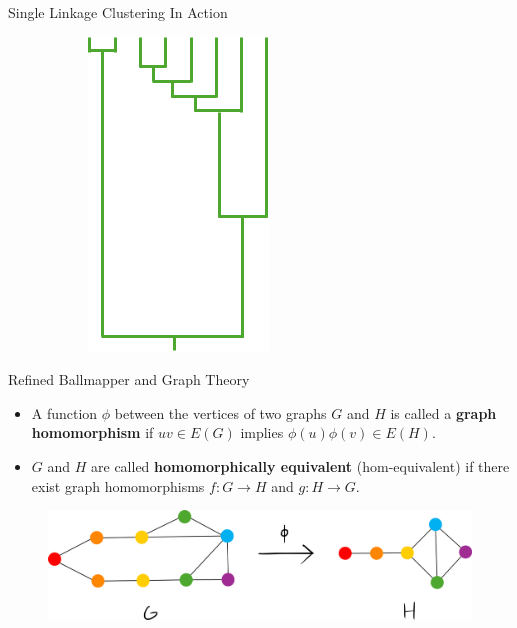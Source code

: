 \documentclass{beamer}
\begin{document}
\begin{frame}{Single Linkage Clustering In Action}
{\begin{figure}[!h]
\begin{subfigure}{.4\linewidth}
          \includegraphics[width=.75\textwidth]{onedend.png}
        \end{subfigure}
        \end{figure}}
  \end{frame}
  
  
  \begin{frame}{Refined Ballmapper and Graph Theory}
    \begin{itemize}
      \item A function $\phi$ between the vertices of two graphs $G$ and $H$ is called a \textbf{graph homomorphism} if $uv\in E(G)$ implies $\phi(u)\phi(v)\in E(H)$.
      \item $G$ and $H$ are called \textbf{homomorphically equivalent} (hom-equivalent) if there exist graph homomorphisms $f: G\to H$ and $g: H\to G$.
    \end{itemize}
    \begin{figure}
      \begin{center}
        \includegraphics[width=1\textwidth]{graphhomo.png}
      \end{center}
    \end{figure}
  \end{frame}
  
\end{document}
